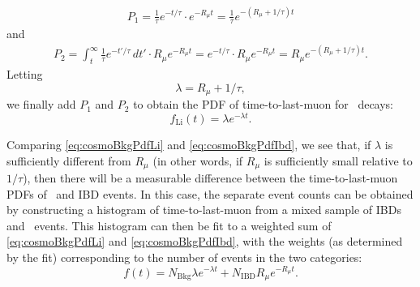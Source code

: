 \documentclass[../thesis.tex]{subfiles}
\begin{document}
\begin{align*}
  P_1 = \frac{1}{\tau} e^{-t/\tau} \cdot e^{-R_\mu t} = \frac{1}{\tau}e^{-(R_\mu + 1/\tau)t}
\end{align*}
and
\begin{align*}
  P_2 = \int_t^\infty \frac{1}{\tau}e^{-t'/\tau}\,dt' \cdot R_\mu e^{-R_\mu t} = e^{-t/\tau} \cdot R_\mu e^{-R_\mu t} = R_\mu e^{-(R_\mu + 1/\tau)t}.
\end{align*}
Letting
\begin{equation}
  \lambda = R_\mu + 1/\tau,
\end{equation}
we finally add $P_1$ and $P_2$ to obtain the PDF of time-to-last-muon for \linine\ decays:
\begin{equation}
  \label{eq:cosmoBkgPdfLi}
  f_{\mathrm{Li}}(t) = \lambda e^{-\lambda t}.
\end{equation}

Comparing \autoref{eq:cosmoBkgPdfLi} and \autoref{eq:cosmoBkgPdfIbd}, we see that, if $\lambda$ is sufficiently different from $R_\mu$ (in other words, if $R_\mu$ is sufficiently small relative to $1/\tau$), then there will be a measurable difference between the time-to-last-muon PDFs of \linine\ and IBD events. In this case, the separate event counts can be obtained by constructing a histogram of time-to-last-muon from a mixed sample of IBDs and \linine\ events. This histogram can then be fit to a weighted sum of \autoref{eq:cosmoBkgPdfLi} and \autoref{eq:cosmoBkgPdfIbd}, with the weights (as determined by the fit) corresponding to the number of events in the two categories:
\begin{equation}
  f(t) = N_{\mathrm{Bkg}} \lambda e^{-\lambda t} + N_{\mathrm{IBD}} R_\mu e^{-R_\mu t}.
\end{equation}
\end{document}
